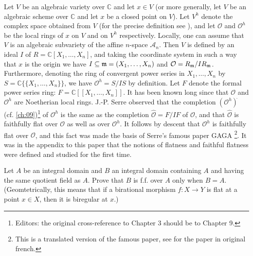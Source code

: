 \documentclass[../main]{subfiles}
\begin{document}
\begin{parremark}
Let $V$ be an algebraic variety over $\mathbb{C}$ and let $x \in V$ (or more generally, let $V$ be an algebraic scheme over $\mathbb{C}$ and let $x$ be a closed point on $V$). Let $V^h$ denote the complex space obtained from $V$ (for the precise definition see \cite{serre1956geometrie-translated}), and let $\mathcal{O}$ and $\mathcal{O}^h$ be the local rings of $x$ on $V$ and on $V^h$ respectively. Locally, one can assume that $V$ is an algebraic subvariety of the affine $n$-space $\mathcal{A}_n$. Then $V$ is defined by an ideal $I$ of $R = \mathbb{C}[X_1, \dots, X_n]$, and taking the coordinate system in such a way that $x$ is the origin we have $I \subseteq \mathfrak{m} = (X_1, \dots, X_n)$ and $\mathcal{O} = R_{\mathfrak{m}}/IR_{\mathfrak{m}}$. Furthermore, denoting the ring of convergent power series in $X_1, \dots, X_n$ by $S = \mathbb{C}\{\{X_1, \dots, X_n\}\}$, we have $\mathcal{O}^h = S/IS$ by definition. Let $F$ denote the formal power series ring: $F = \mathbb{C}[[X_1, \dots, X_n]]$. It has been known long since that $\mathcal{O}$ and $\mathcal{O}^h$ are Noetherian local rings. J.-P. Serre observed that the completion $(\mathcal{O}^h)^{\hat{}}$ (cf. \ref{ch:09})\footnote{Editors: the original cross-reference to Chapter 3 should be to Chapter 9.} of $\mathcal{O}^h$ is the same as the completion $\hat{\mathcal{O}} = F/IF$ of $\mathcal{O}$, and that $\hat{\mathcal{O}}$ is faithfully flat over $\mathcal{O}$ as well as over $\mathcal{O}^h$. It follows by descent that $\mathcal{O}^h$ is faithfully flat over $\mathcal{O}$, and this fact was made the basis of Serre's famous paper GAGA \cite{serre1956geometrie-translated}\footnote{This is a translated version of the famous paper, see \cite{serre1956geometrie} for the paper in original french.}. It was in the appendix to this paper that the notions of flatness and faithful flatness were defined and studied for the first time.
\end{parremark}

\begin{exercise}
Let $A$ be an integral domain and $B$ an integral domain containing $A$ and having the same quotient field as $A$. Prove that $B$ is f.f. over $A$ only when $B = A$. (Geomtetrically, this means that if a birational morphism $f: X \longrightarrow Y$ is flat at a point $x \in X$, then it is biregular at $x$.)
\end{exercise}
\end{document}
